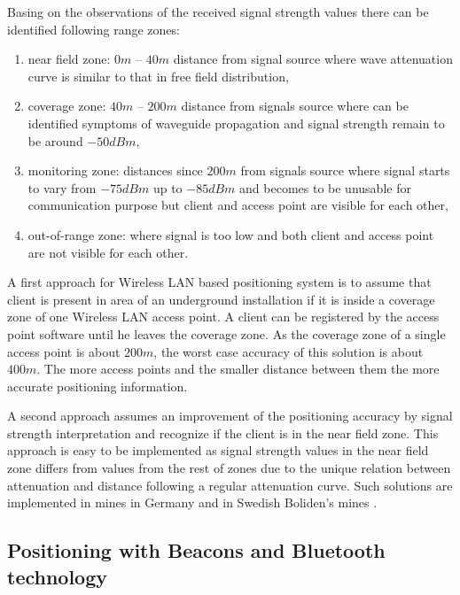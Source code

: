 \documentclass[../main.tex]{subfiles}
\begin{document}
Basing on the observations of the received signal strength values there can be identified following range zones\cite{Thesis_CM}:
\begin{enumerate}
	\item near field zone: $0m$ -- $40m$ distance from signal source where wave attenuation curve is similar to that in free field distribution,
	\item coverage zone: $40m$ -- $200m$ distance from signals source where can be identified symptoms of waveguide propagation and signal strength remain to be around $-50 dBm$,
	\item monitoring zone: distances since $200m$ from signals source where signal starts to vary from $-75dBm$ up to $-85 dBm$ and becomes to be unusable for communication purpose but client and access point are visible for each other,
	\item out-of-range zone: where signal is too low and both client and access point are not visible for each other.
\end{enumerate}

A first approach for Wireless LAN based positioning system is to assume that client is present in area of an underground installation if it is inside a coverage zone of one Wireless LAN access point. A client can be registered by the access point software until he leaves the coverage zone. As the coverage zone of a single access point is about $200m$, the worst case accuracy of this solution is about $400 m$. The more access points and the smaller distance between them the more accurate positioning information.

A second approach assumes an improvement of the positioning accuracy by signal strength interpretation and recognize if the client is in the near field zone. This approach is easy to be implemented as signal strength values in the near field zone differs from values from the rest of zones due to the unique relation between attenuation and distance following a regular attenuation curve. Such solutions are implemented in mines in Germany \cite{Thesis_CM} and in Swedish Boliden's mines \cite{thesis_tablet_positioning}.





\subsection{Positioning with Beacons and Bluetooth technology} %
\label{sec:positioning_with_beacons_and_bluetooth_technology}
\end{document}

